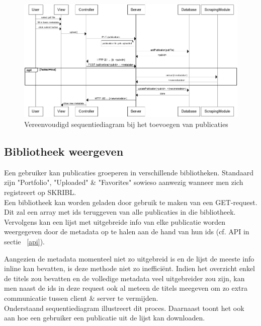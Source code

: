 \documentclass{article}
\begin{document}
\begin{figure}[!h]
\centering
 \includegraphics[width=145mm]{adding-publications.png}
 \caption{Vereenvoudigd sequentiediagram bij het toevoegen van publicaties}
 \label{upload-sequence}
\end{figure}

\subsection{Bibliotheek weergeven}

Een gebruiker kan publicaties groeperen in verschillende bibliotheken. Standaard zijn "Portfolio", "Uploaded" \& "Favorites" sowieso aanwezig wanneer men zich registreert op SKRIBL. \\

Een bibliotheek kan worden geladen door gebruik te maken van een GET-request. Dit zal een array met ids teruggeven van alle publicaties in die bibliotheek. Vervolgens kan een lijst met uitgebreide info van elke publicatie worden weergegeven door de metadata op te halen aan de hand van hun ids (cf. API in sectie ~\ref{api}).

Aangezien de metadata momenteel niet zo uitgebreid is en de lijst de meeste info inline kan bevatten, is deze methode niet zo ineffici\"ent. Indien het overzicht enkel de titels zou bevatten en de volledige metadata veel uitgebreider zou zijn, kan men naast de ids in deze request ook al meteen de titels meegeven om zo extra communicatie tussen client \& server te vermijden. \\

Onderstaand sequentiediagram illustreert dit proces. Daarnaast toont het ook aan hoe een gebruiker een publicatie uit de lijst kan downloaden.
\end{document}
